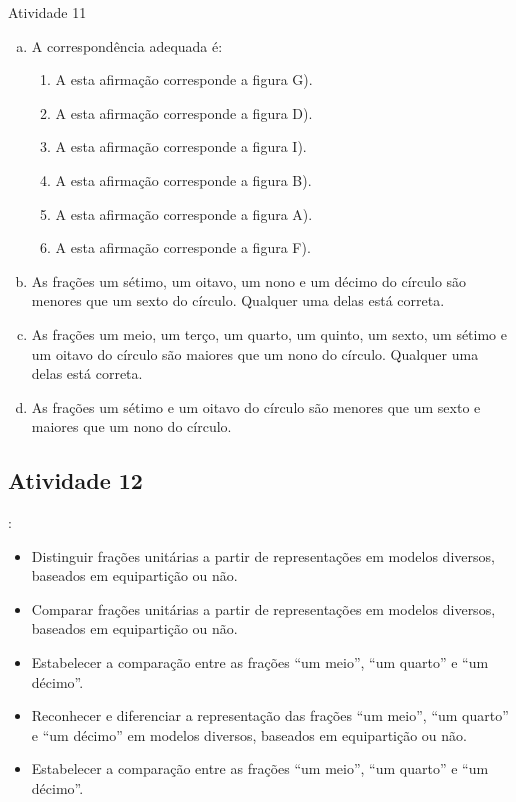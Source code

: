 \begin{resposta*}{Atividade 11}
\begin{enumerate}[a),wide,labelindent=0pt] %
    \item       A correspondência adequada é:
\begin{enumerate} [\;\; I), labelindent=0pt] %
        \item           A esta afirmação corresponde a figura G).
        \item           A esta afirmação corresponde a figura D).
        \item           A esta afirmação corresponde a figura I).
        \item           A esta afirmação corresponde a figura B).
        \item           A esta afirmação corresponde a figura A).
        \item           A esta afirmação corresponde a figura F).
\end{enumerate} %

    \item       As frações um sétimo, um oitavo, um nono e um décimo do círculo são menores que um sexto do círculo. Qualquer uma delas está correta.
    \item       As frações um meio, um terço, um quarto, um quinto, um sexto, um sétimo e um oitavo do círculo são maiores que um nono do círculo. Qualquer uma delas está correta.
    \item       As frações um sétimo e um oitavo do círculo são menores que um sexto e maiores que um nono do círculo.
\end{enumerate} %
\end{resposta*}

\newpage

\subsection{Atividade 12}

  : \vspace{.1cm}

\begin{itemize} %
    \item       Distinguir frações unitárias a partir de representações em modelos diversos, baseados em equipartição ou não.
    \item       Comparar frações unitárias a partir de representações em modelos diversos, baseados em equipartição ou não.
    \item       Estabelecer a comparação entre as frações       ``um meio'',       ``um quarto'' e       ``um décimo''.
    \item       Reconhecer e diferenciar a representação das frações       ``um meio'',       ``um quarto'' e       ``um décimo'' em modelos diversos, baseados em equipartição ou não.
    \item       Estabelecer a comparação entre as frações       ``um meio'',       ``um quarto'' e       ``um décimo''.
\end{itemize} %


